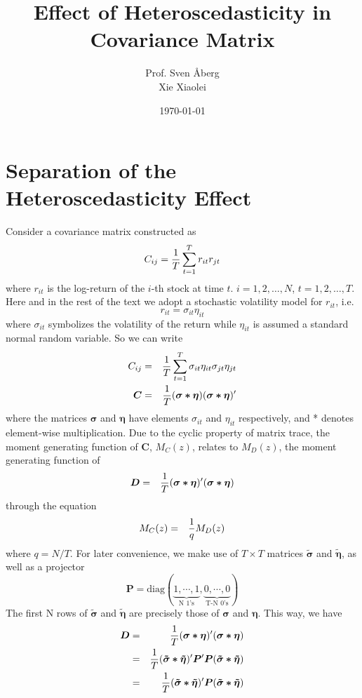 \documentclass{article}
\author{
  Prof. Sven \AA berg \\
  Xie Xiaolei}
\date{\today}
\title{Effect of Heteroscedasticity in Covariance Matrix}
\begin{document}
\maketitle

\section{Separation of the Heteroscedasticity Effect}
Consider a covariance matrix constructed as
$$
C_{ij} = {1 \over T}\sum_{t=1}^T r_{it} r_{jt}
$$
where $r_{it}$ is the log-return of the $i$-th stock at time $t$. $i =
1, 2, \dots, N$, $t = 1,2,\dots,T$. Here and in the rest of the
text we adopt a stochastic volatility model for $r_{it}$, i.e.
$$
r_{it} = \sigma_{it} \eta_{it}
$$
where $\sigma_{it}$ symbolizes the volatility of the return while
$\eta_{it}$ is assumed a standard normal random variable.
So we can write
\begin{eqnarray}
C_{ij} &=& {1 \over T}\sum_{t=1}^T \sigma_{it} \eta_{it} \sigma_{jt}
\eta_{jt} \nonumber \\
\bm{C} &=& {1 \over T} (\bm{\sigma * \eta}) (\bm{\sigma *
  \eta})' \label{eq:C}
\end{eqnarray}
where the matrices $\bm{\sigma}$ and $\bm{\eta}$ have elements
$\sigma_{it}$ and $\eta_{it}$ respectively, and * denotes element-wise
multiplication. Due to the cyclic property of matrix trace, the
moment generating function of $\bm{C}$, $M_C(z)$, relates to $M_D(z)$,
the moment generating function of
\begin{eqnarray*}
  \bm{D} &=& {1 \over T} (\bm{\sigma * \eta})' (\bm{\sigma * \eta})
\end{eqnarray*}
through the equation
\begin{eqnarray*}
  M_C(z) &=& {1 \over q} M_D(z)
\end{eqnarray*}
where $q = N/T$. For later convenience, we make use of $T \times T$
matrices $\bm{\tilde{\sigma}}$ and $\bm{\tilde{\eta}}$, as well as a
projector
$$
\bm{P} = \text{diag}(\underbrace{1, \cdots, 1}_{\text{N 1's}}, 
\underbrace{0, \cdots, 0}_{\text{T-N 0's}})
$$
The first N rows of $\tilde{\bm{\sigma}}$ and $\bm{\tilde{\eta}}$ are
precisely those of $\bm{\sigma}$ and $\bm{\eta}$. This way, we have
\begin{eqnarray*}
\bm D &=& {1 \over T} (\bm{\sigma * \eta})' (\bm{\sigma * \eta}) \\
&=& {1 \over T} (\bm{\tilde{\sigma} * \tilde{\eta}})' \bm P'
\bm P (\bm{\tilde{\sigma} * \tilde{\eta}}) \\
&=& {1 \over T} (\bm{\tilde{\sigma} * \tilde{\eta}})'
\bm P (\bm{\tilde{\sigma} * \tilde{\eta}}) \\
\end{eqnarray*}
\end{document}
